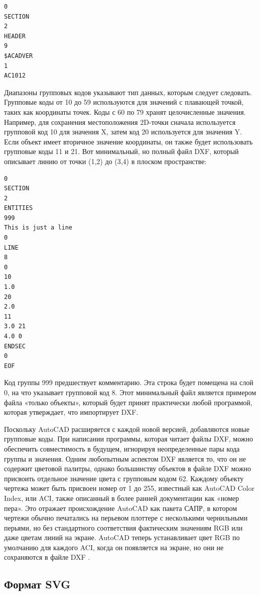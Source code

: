 \begin{lstlisting}[label=list:dxfheader]
0
SECTION
2
HEADER
9
$ACADVER
1
AC1012
\end{lstlisting}

Диапазоны групповых кодов указывают тип данных, которым следует следовать. Групповые коды от 10 до 59 используются для значений с плавающей точкой, таких как координаты точек. Коды с 60 по 79 хранят целочисленные значения. Например, для сохранения местоположения 2D-точки сначала используется групповой код 10 для значения X, затем код 20 используется для значения Y. Если объект имеет вторичное значение координаты, он также будет использовать групповые коды 11 и 21. Вот минимальный, но полный файл DXF, который описывает линию от точки (1,2) до (3,4) в плоском пространстве:

\begin{lstlisting}[label=list:dxflinefull]
0
SECTION
2
ENTITIES
999
This is just a line
0
LINE
8
0
10
1.0
20
2.0
11
3.0 21
4.0 0
ENDSEC
0
EOF
\end{lstlisting}

Код группы 999 предшествует комментарию. Эта строка будет помещена на слой 0, на что указывает групповой код 8. Этот минимальный файл является примером файла «только объекты», который будет принят практически любой программой, которая утверждает, что импортирует DXF.

Поскольку AutoCAD расширяется с каждой новой версией, добавляются новые групповые коды. При написании программы, которая читает файлы DXF, можно обеспечить совместимость в будущем, игнорируя неопределенные пары кода группы и значения.
Одним любопытным аспектом DXF является то, что он не содержит цветовой палитры, однако большинству объектов в файле DXF можно присвоить отдельное значение цвета с групповым кодом 62. Каждому объекту чертежа может быть присвоен номер от 1 до 255, известный как AutoCAD Color Index, или ACI, также описанный в более ранней документации как «номер пера». Это отражает происхождение AutoCAD как пакета САПР, в котором чертежи обычно печатались на перьевом плоттере с несколькими чернильными перьями, но без стандартного соответствия фактическим значениям RGB или даже цветам линий на экране. AutoCAD теперь устанавливает цвет RGB по умолчанию для каждого ACI, когда он появляется на экране, но они не сохраняются в файле DXF \cite{murray1996encyclopedia}.

\subsection{Формат SVG} \label{subs:svg}
